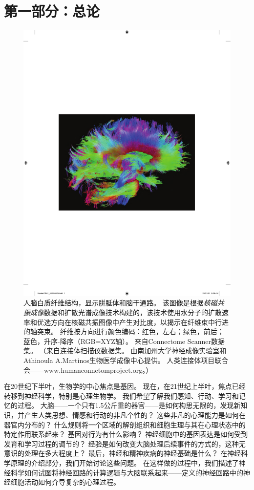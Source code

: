 \chapter*{第一部分：总论}

\begin{figure}[htbp]
	\centering
	\includegraphics[width=0.9\linewidth]{chap01/fig_1_0}
	\caption{人脑白质纤维结构，显示胼胝体和脑干通路。
		该图像是根据\textit{核磁共振成像}数据和扩散光谱成像技术构建的，该技术使用水分子的扩散速率和优选方向在核磁共振图像中产生对比度，以揭示在纤维束中行进的轴突束。
		纤维按方向进行颜色编码：红色，左右；绿色，前后；蓝色，升序-降序（RGB=XYZ轴）。
		来自Connectome Scanner数据集。
		（来自连接体扫描仪数据集。
		由南加州大学神经成像实验室和Athinoula A.Martinos生物医学成像中心提供。
		人类连接体项目联合会——www.humanconnetomproject.org。）}
	\label{fig:1_0}
\end{figure}

在20世纪下半叶，生物学的中心焦点是基因。
现在，在21世纪上半叶，焦点已经转移到神经科学，特别是心理生物学。
我们希望了解我们感知、行动、学习和记忆的过程。
大脑——一个只有1.5公斤重的器官——是如何构思无限的，发现新知识，并产生人类思想、情感和行动的非凡个性的？
这些非凡的心理能力是如何在器官内分布的？
什么规则将一个区域的解剖组织和细胞生理与其在心理状态中的特定作用联系起来？
基因对行为有什么影响？
神经细胞中的基因表达是如何受到发育和学习过程的调节的？
经验是如何改变大脑处理后续事件的方式的，这种无意识的处理在多大程度上？
最后，神经和精神疾病的神经基础是什么？
在神经科学原理的介绍部分，我们开始讨论这些问题。
在这样做的过程中，我们描述了神经科学如何试图将神经回路的计算逻辑与大脑联系起来——定义的神经回路中的神经细胞活动如何介导复杂的心理过程。


